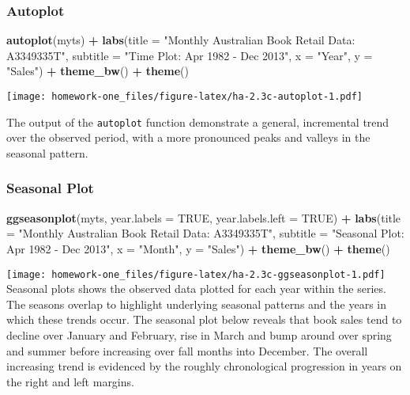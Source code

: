 \documentclass[openany]{book}
\newenvironment{Shaded}{\begin{snugshade}}{\end{snugshade}}
\newcommand{\DataTypeTok}[1]{\textcolor[rgb]{0.13,0.29,0.53}{#1}}
\newcommand{\KeywordTok}[1]{\textcolor[rgb]{0.13,0.29,0.53}{\textbf{#1}}}
\newcommand{\NormalTok}[1]{#1}
\newcommand{\OperatorTok}[1]{\textcolor[rgb]{0.81,0.36,0.00}{\textbf{#1}}}
\newcommand{\OtherTok}[1]{\textcolor[rgb]{0.56,0.35,0.01}{#1}}
\newcommand{\StringTok}[1]{\textcolor[rgb]{0.31,0.60,0.02}{#1}}
\begin{document}
\hypertarget{autoplot}{%
\subsubsection{Autoplot}\label{autoplot}}

\begin{Shaded}
\begin{Highlighting}[]
\KeywordTok{autoplot}\NormalTok{(myts) }\OperatorTok{+}\StringTok{ }\KeywordTok{labs}\NormalTok{(}\DataTypeTok{title =} \StringTok{"Monthly Australian Book Retail Data: A3349335T"}\NormalTok{, }
  \DataTypeTok{subtitle =} \StringTok{"Time Plot: Apr 1982 - Dec 2013"}\NormalTok{, }\DataTypeTok{x =} \StringTok{"Year"}\NormalTok{, }
  \DataTypeTok{y =} \StringTok{"Sales"}\NormalTok{) }\OperatorTok{+}\StringTok{ }\KeywordTok{theme_bw}\NormalTok{() }\OperatorTok{+}\StringTok{ }\KeywordTok{theme}\NormalTok{()}
\end{Highlighting}
\end{Shaded}

\texttt{[image: homework-one\_files/figure-latex/ha-2.3c-autoplot-1.pdf]}

The output of the \texttt{autoplot} function demonstrate a general, incremental trend over the observed period, with a more pronounced peaks and valleys in the seasonal pattern.

\hypertarget{seasonal-plot}{%
\subsubsection{Seasonal Plot}\label{seasonal-plot}}

\begin{Shaded}
\begin{Highlighting}[]
\KeywordTok{ggseasonplot}\NormalTok{(myts, }\DataTypeTok{year.labels =} \OtherTok{TRUE}\NormalTok{, }\DataTypeTok{year.labels.left =} \OtherTok{TRUE}\NormalTok{) }\OperatorTok{+}\StringTok{ }
\StringTok{  }\KeywordTok{labs}\NormalTok{(}\DataTypeTok{title =} \StringTok{"Monthly Australian Book Retail Data: A3349335T"}\NormalTok{, }
    \DataTypeTok{subtitle =} \StringTok{"Seasonal Plot: Apr 1982 - Dec 2013"}\NormalTok{, }
    \DataTypeTok{x =} \StringTok{"Month"}\NormalTok{, }\DataTypeTok{y =} \StringTok{"Sales"}\NormalTok{) }\OperatorTok{+}\StringTok{ }\KeywordTok{theme_bw}\NormalTok{() }\OperatorTok{+}\StringTok{ }\KeywordTok{theme}\NormalTok{()}
\end{Highlighting}
\end{Shaded}

\texttt{[image: homework-one\_files/figure-latex/ha-2.3c-ggseasonplot-1.pdf]}
Seasonal plots shows the observed data plotted for each year within the series. The seasons overlap to highlight underlying seasonal patterns and the years in which these trends occur. The seasonal plot below reveals that book sales tend to decline over January and February, rise in March and bump around over spring and summer before increasing over fall months into December. The overall increasing trend is evidenced by the roughly chronological progression in years on the right and left margins.
\end{document}

